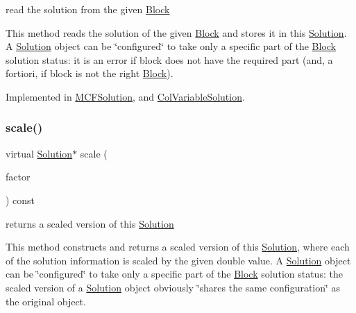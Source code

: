 read the solution from the given \mbox{\hyperlink{class_s_m_spp__di__unipi__it_1_1_block}{Block}} 

This method reads the solution of the given \mbox{\hyperlink{class_s_m_spp__di__unipi__it_1_1_block}{Block}} and stores it in this \mbox{\hyperlink{class_s_m_spp__di__unipi__it_1_1_solution}{Solution}}. A \mbox{\hyperlink{class_s_m_spp__di__unipi__it_1_1_solution}{Solution}} object can be \char`\"{}configured\char`\"{} to take only a specific part of the \mbox{\hyperlink{class_s_m_spp__di__unipi__it_1_1_block}{Block}} solution status\+: it is an error if block does not have the required part (and, a fortiori, if block is not the right \mbox{\hyperlink{class_s_m_spp__di__unipi__it_1_1_block}{Block}}). 

Implemented in \mbox{\hyperlink{class_s_m_spp__di__unipi__it_1_1_m_c_f_solution_a4feeb8f2f46fde71030bd3d8070cd90d}{M\+C\+F\+Solution}}, and \mbox{\hyperlink{class_s_m_spp__di__unipi__it_1_1_col_variable_solution_a13487898d41f593b3cc0ae6a69feb3ff}{Col\+Variable\+Solution}}.

\mbox{\label{class_s_m_spp__di__unipi__it_1_1_solution_abf1a2d1763f128a72b2677d4b9ff4d3b}} 
\subsubsection{\texorpdfstring{scale()}{scale()}}
{\footnotesize\ttfamily virtual \mbox{\hyperlink{class_s_m_spp__di__unipi__it_1_1_solution}{Solution}}$\ast$ scale (\begin{DoxyParamCaption}\item[{double}]{factor }\end{DoxyParamCaption}) const\hspace{0.3cm}{\ttfamily [pure virtual]}}



returns a scaled version of this \mbox{\hyperlink{class_s_m_spp__di__unipi__it_1_1_solution}{Solution}} 

This method constructs and returns a scaled version of this \mbox{\hyperlink{class_s_m_spp__di__unipi__it_1_1_solution}{Solution}}, where each of the solution information is scaled by the given double value. A \mbox{\hyperlink{class_s_m_spp__di__unipi__it_1_1_solution}{Solution}} object can be \char`\"{}configured\char`\"{} to take only a specific part of the \mbox{\hyperlink{class_s_m_spp__di__unipi__it_1_1_block}{Block}} solution status\+: the scaled version of a \mbox{\hyperlink{class_s_m_spp__di__unipi__it_1_1_solution}{Solution}} object obviously \char`\"{}shares the same configuration\char`\"{} as the original object.

